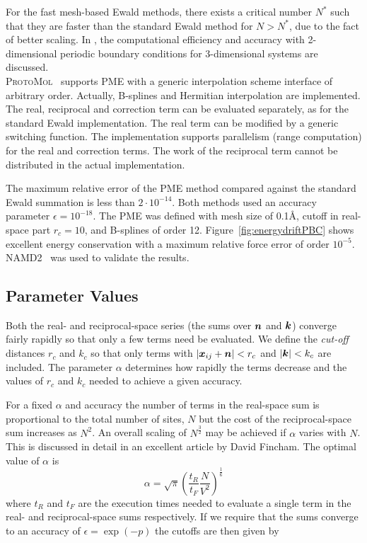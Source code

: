 \documentclass[11pt]{article}
\newcommand{\ProtoMol}{\textsc{ProtoMol }}
\providecommand{\bm}[1]{\mbox{\boldmath${#1}$}}
\begin{document}
For the fast mesh-based Ewald methods, there exists a critical number $N^*$ such that
they are faster than the standard Ewald method for $N>N^*$, due to the
fact of better scaling. In \cite{KaNa01}, the
computational efficiency and accuracy with 2-dimensional periodic
boundary conditions for 3-dimensional systems are discussed.\\

\ProtoMol\ supports PME with a generic
interpolation scheme interface
of arbitrary order. Actually, B-splines and Hermitian interpolation are
implemented. The  real, reciprocal and correction term can be evaluated
separately, as for the standard Ewald implementation. The real term
can be modified by a generic switching function. The implementation supports parallelism (range computation)
for the real and correction terms. The work of the reciprocal
term cannot be distributed in the actual implementation.

The maximum relative error of the PME method compared against the
standard Ewald summation is less than $2\cdot 10^{-14}$. Both methods
 used an accuracy parameter $\epsilon = 10^{-18}$. The PME was defined with mesh size of
0.1\AA , cutoff in real-space part $r_c = 10$, and B-splines  of order
12. Figure~\ref{fig:energydriftPBC} shows  excellent energy
conservation with a maximum relative force error of order $10^{-5}$.
NAMD2~\cite{Kale99} was used to validate the results.
\subsection{Parameter Values}
\label{sec:ewald-auto}

Both the real- and reciprocal-space series (the sums over $\bm{n}$ and
$\bm{k}$) converge fairly rapidly so that only a few terms need be
evaluated.  We define the \emph{cut-off} distances $r_c$ and $k_c$ so
that only terms with $| \bm{x}_{ij} +\bm{n} | < r_c$ and $|\bm{k}| < k_c$
are included.  The parameter $\alpha$ determines how rapidly the terms
decrease and the values of $r_c$ and $k_c$ needed to achieve a given
accuracy. 

For a fixed $\alpha$ and accuracy the number of terms in the
real-space sum is proportional to the total number of sites, $N$ but
the cost of the reciprocal-space sum increases as $N^2$. An overall
scaling of $N^\frac{3}{2}$ may be achieved if $\alpha$ varies with
$N$. This is discussed in detail in an excellent article by David
Fincham\cite{}.  The optimal value of $\alpha$ is
%
\begin{equation}
\alpha = \sqrt{\pi} \left ( \frac{t_R}{t_F} \frac{N}{V^2}\right )
^\frac{1}{6} 
\end{equation}
%
where $t_R$ and $t_F$ are the execution times needed to evaluate a
single term in the real- and reciprocal-space sums respectively.
If we require that the sums converge to an accuracy of $ \epsilon =
\exp ( -p )$ the cutoffs are then given by
\end{document}

